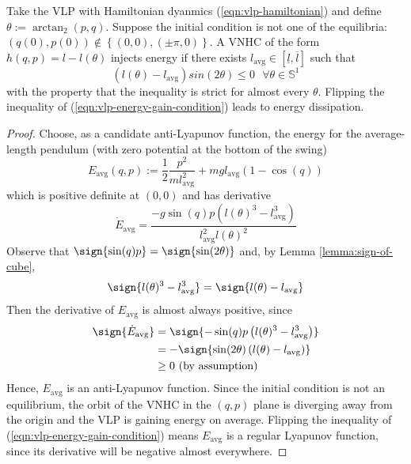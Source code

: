 \begin{thm}\label{thm:vlp-energy-stabilization}
   Take the VLP with Hamiltonian dyanmics (\ref{eqn:vlp-hamiltonian}) and define
   \(\theta := \arctan_2(p,q)\). Suppose the initial condition is not one of the
   equilibria: \((q(0),p(0)) \not \in \left\{(0,0), (\pm\pi,0)\right\}\).
   A VNHC of the form \(h(q,p) = l - l(\theta)\) injects energy if there exists 
   \(l_\text{avg} \in [\underline{l},\overline{l}]\) such that 
   \begin{equation}\label{eqn:vlp-energy-gain-condition}
      \left(l(\theta) - l_\text{avg}\right)sin(2\theta) \leq 0 \text{ }\forall \theta \in \mathbb{S}^1
   \end{equation}
   with the property that the inequality is strict for almost every \(\theta\).
   Flipping the inequality of (\ref{eqn:vlp-energy-gain-condition}) leads to
   energy dissipation.
\end{thm}
\begin{proof}
    Choose, as a candidate anti-Lyapunov function, the energy for the
    average-length pendulum (with zero potential at the bottom of the swing)
    \[
       E_\text{avg}(q,p) := \frac{1}{2}\frac{p^2}{m l_\text{avg}^2} 
                    + m g l_\text{avg} (1-\cos(q))
    \]
    which is positive definite at \((0,0)\) and has derivative 
    \[
      \dot{E}_\text{avg} = \frac{-g\sin(q)p \left(l(\theta)^3 - l_\text{avg}^3\right)}
                 {l_\text{avg}^2l(\theta)^2}
    \]
    Observe that \(\sign{\sin(q)p} = \sign{\sin(2\theta)}\) and, 
    by Lemma \ref{lemma:sign-of-cube},
    \[ 
       \sign{l(\theta)^3 - l_\text{avg}^3} = \sign{ l(\theta) - l_\text{avg}}
    \]
    Then the derivative of \(E_\text{avg}\) is almost always positive, since
    \begin{align*}
       \label{eq:}
       \sign{\dot{E}_\text{avg}} &= \sign{-\sin(q)p \left(l(\theta)^3 - l_\text{avg}^3\right)} \\
                   &= -\sign{\sin(2\theta) \left(l(\theta) - l_\text{avg}\right)} \\
                   &\geq 0 \text{ (by assumption)}
    \end{align*}
    Hence, \(E_\text{avg}\) is an anti-Lyapunov function.
    Since the initial condition is not an equilibrium,
    the orbit of the VNHC in the \((q,p)\) plane is diverging away from the
    origin and the VLP is gaining energy on average.
    Flipping the inequality of (\ref{eqn:vlp-energy-gain-condition}) 
    means \(E_\text{avg}\) is a regular Lyapunov function, since its derivative
    will be negative almost everywhere.
\end{proof}

